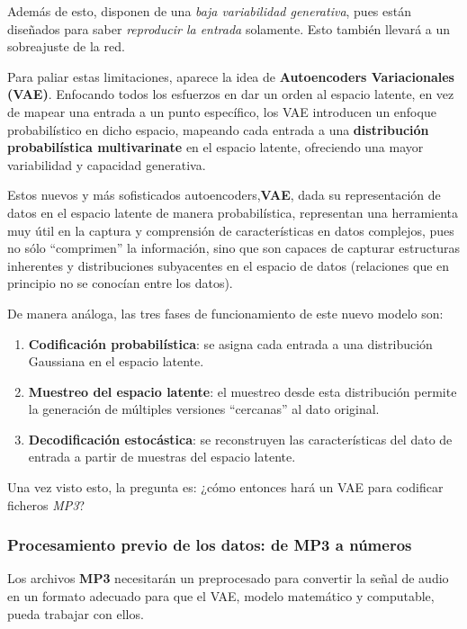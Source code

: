 Además de esto, disponen de una \emph{baja variabilidad generativa}, pues están diseñados para saber \emph{reproducir la entrada} solamente. Esto también llevará a un sobreajuste de la red.

Para paliar estas limitaciones, aparece la idea de \textbf{Autoencoders Variacionales (VAE)}. Enfocando todos los esfuerzos en dar un orden al espacio latente, en vez de mapear una entrada a un punto específico, los VAE introducen un enfoque probabilístico en dicho espacio, mapeando cada entrada a una \textbf{distribución probabilística \textbf{multivarinate}} en el espacio latente, ofreciendo una mayor variabilidad y capacidad generativa.

Estos nuevos y más sofisticados  autoencoders,\textbf{VAE}, dada su representación de datos en el espacio latente de manera probabilística, representan una herramienta muy útil en la captura y comprensión de características en datos complejos, pues no sólo ``comprimen'' la información, sino que son capaces de capturar estructuras inherentes y distribuciones subyacentes en el espacio de datos (relaciones que en principio no se conocían entre los datos).

De manera análoga, las tres fases de funcionamiento de este nuevo modelo son:

\begin{enumerate}
    \item \textbf{Codificación probabilística}: se asigna cada entrada a una distribución Gaussiana en el espacio latente.
    \item \textbf{Muestreo del espacio latente}: el muestreo desde esta distribución permite la generación de múltiples versiones ``cercanas'' al dato original.
    \item \textbf{Decodificación estocástica}: se reconstruyen las características del dato de entrada a partir de muestras del espacio latente.
\end{enumerate}

Una vez visto esto, la pregunta es: ¿cómo entonces hará un VAE para codificar ficheros \emph{MP3}?

\subsubsection{Procesamiento previo de los datos: de MP3 a números}
\label{proc_mp3}
Los archivos \textbf{MP3} necesitarán un preprocesado para convertir la señal de audio en un formato adecuado para que el VAE, modelo matemático y computable, pueda trabajar con ellos.


